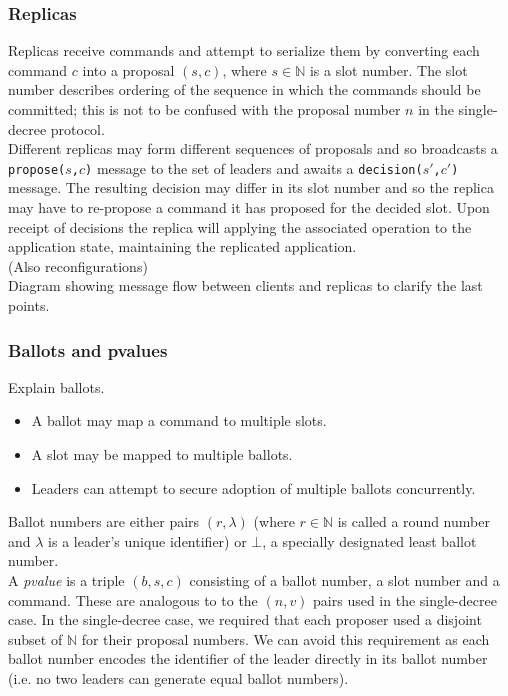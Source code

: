 \subsubsection{Replicas}

Replicas receive commands and attempt to serialize them by converting each command $c$ into a proposal $\left(s,c\right)$, where $s \in \mathbb{N}$ is a slot number. The slot number describes ordering of the sequence in which the commands should be committed; this is not to be confused with the proposal number $n$ in the single-decree protocol. \\

Different replicas may form different sequences of proposals and so broadcasts a \texttt{propose($s$,$c$)} message to the set of leaders and awaits a \texttt{decision($s'$,$c'$)} message. The resulting decision may differ in its slot number and so the replica may have to re-propose a command it has proposed for the decided slot. Upon receipt of decisions the replica will applying the associated operation to the application state, maintaining the replicated application. \\

{\color{red}(Also reconfigurations)} \\

{\color{blue}Diagram showing message flow between clients and replicas to clarify the last points.}


\subsubsection{Ballots and pvalues}

Explain ballots.

\begin{itemize}
  \item A ballot may map a command to multiple slots.
  \item A slot may be mapped to multiple ballots.
  \item Leaders can attempt to secure adoption of multiple ballots concurrently.
\end{itemize} 

Ballot numbers are either pairs $\left(r, \lambda\right)$ (where $r \in \mathbb{N}$ is called a round number and $\lambda$ is a leader's unique identifier) or $\bot$, a specially designated least ballot number. \\

A \emph{pvalue} is a triple $\left(b, s, c \right)$ consisting of a ballot number, a slot number and a command. These are analogous to to the $\left( n, v \right)$ pairs used in the single-decree case. In the single-decree case, we required that each proposer used a disjoint subset of $\mathbb{N}$ for their proposal numbers. We can avoid this requirement as each ballot number encodes the identifier of the leader directly in its ballot number (i.e. no two leaders can generate equal ballot numbers). \\


